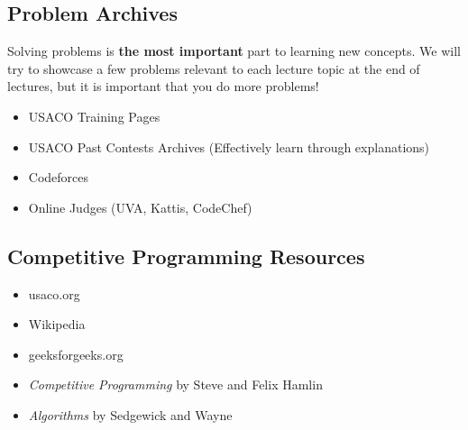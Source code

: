 \documentclass[11pt]{article}
\begin{document}
\subsection{Problem Archives}
    Solving problems is \textbf{the most important} part to learning new concepts. We will try to showcase a few problems relevant to each lecture topic at the end of lectures, but it is important that you do more problems!
\begin{itemize}
  \item USACO Training Pages
  \item USACO Past Contests Archives (Effectively learn through explanations)
  \item Codeforces
  \item Online Judges (UVA, Kattis, CodeChef)
\end{itemize}

\subsection{Competitive Programming Resources}
\begin{itemize}
  \item usaco.org
  \item Wikipedia
  \item geeksforgeeks.org
  \item \textit{Competitive Programming} by Steve and Felix Hamlin 
  \item \textit{Algorithms} by Sedgewick and Wayne
\end{itemize}
\end{document}
